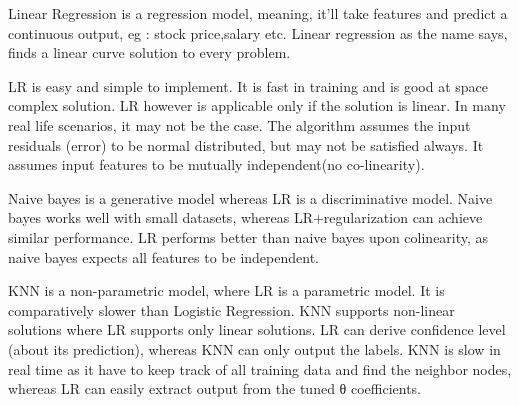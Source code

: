 \documentclass[
]{article}
\begin{document}
Linear Regression is a regression model, meaning, it'll take features
and predict a continuous output, eg : stock price,salary etc. Linear
regression as the name says, finds a linear curve solution to every
problem.

LR is easy and simple to implement. It is fast in training and is good
at space complex solution. LR however is applicable only if the solution
is linear. In many real life scenarios, it may not be the case. The
algorithm assumes the input residuals (error) to be normal distributed,
but may not be satisfied always. It assumes input features to be
mutually independent(no co-linearity).

Naive bayes is a generative model whereas LR is a discriminative model.
Naive bayes works well with small datasets, whereas LR+regularization
can achieve similar performance. LR performs better than naive bayes
upon colinearity, as naive bayes expects all features to be independent.

KNN is a non-parametric model, where LR is a parametric model. It is
comparatively slower than Logistic Regression. KNN supports non-linear
solutions where LR supports only linear solutions. LR can derive
confidence level (about its prediction), whereas KNN can only output the
labels. KNN is slow in real time as it have to keep track of all
training data and find the neighbor nodes, whereas LR can easily extract
output from the tuned θ coefficients.
\end{document}
